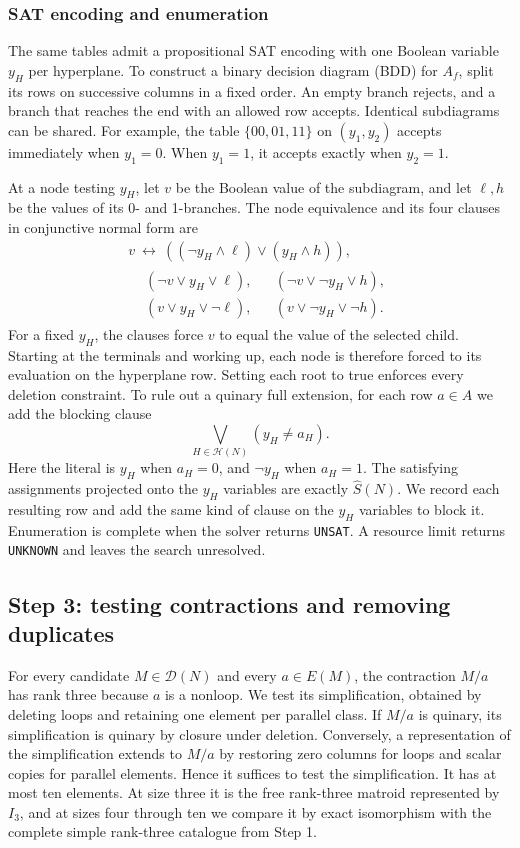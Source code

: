 \documentclass[11pt,letterpaper,titlepage]{article}
\begin{document}
\subsubsection{SAT encoding and enumeration}

The same tables admit a propositional SAT encoding with one Boolean variable \(y_H\) per hyperplane. To construct a binary decision diagram (BDD) for \(A_f\), split its rows on successive columns in a fixed order. An empty branch rejects, and a branch that reaches the end with an allowed row accepts. Identical subdiagrams can be shared. For example, the table \(\{00,01,11\}\) on \((y_1,y_2)\) accepts immediately when \(y_1=0\). When \(y_1=1\), it accepts exactly when \(y_2=1\).

At a node testing \(y_H\), let \(v\) be the Boolean value of the subdiagram, and let \(\ell,h\) be the values of its 0- and 1-branches. The node equivalence and its four clauses in conjunctive normal form are
\[
\begin{gathered}
 v\ \longleftrightarrow\ ((\neg y_H\land\ell)\lor(y_H\land h)),\\[0.6em]
\begin{aligned}
 &(\neg v\lor y_H\lor\ell),
 &&(\neg v\lor\neg y_H\lor h),\\
 &(v\lor y_H\lor\neg\ell),
 &&(v\lor\neg y_H\lor\neg h).
\end{aligned}
\end{gathered}
\]
For a fixed \(y_H\), the clauses force \(v\) to equal the value of the selected child. Starting at the terminals and working up, each node is therefore forced to its evaluation on the hyperplane row. Setting each root to true enforces every deletion constraint. To rule out a quinary full extension, for each row \(a\in A\) we add the blocking clause
\[
 \bigvee_{H\in\mathcal{H}(N)}(y_H\ne a_H).
\]
Here the literal is \(y_H\) when \(a_H=0\), and \(\neg y_H\) when \(a_H=1\). The satisfying assignments projected onto the \(y_H\) variables are exactly \(\widehat S(N)\). We record each resulting row and add the same kind of clause on the \(y_H\) variables to block it. Enumeration is complete when the solver returns \texttt{UNSAT}. A resource limit returns \texttt{UNKNOWN} and leaves the search unresolved.

\subsection{Step 3: testing contractions and removing duplicates}

For every candidate \(M\in\mathcal{D}(N)\) and every \(a\in E(M)\), the contraction \(M/a\) has rank three because \(a\) is a nonloop. We test its simplification, obtained by deleting loops and retaining one element per parallel class. If \(M/a\) is quinary, its simplification is quinary by closure under deletion. Conversely, a representation of the simplification extends to \(M/a\) by restoring zero columns for loops and scalar copies for parallel elements. Hence it suffices to test the simplification. It has at most ten elements. At size three it is the free rank-three matroid represented by \(I_3\), and at sizes four through ten we compare it by exact isomorphism with the complete simple rank-three catalogue from Step 1.
\end{document}
